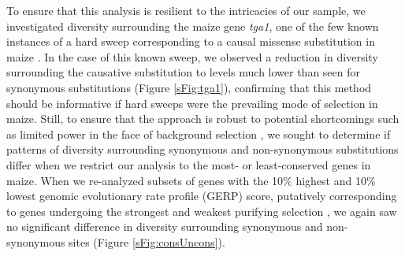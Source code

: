 \documentclass{pnastwo}
\begin{document}
\begin{article}
To ensure that this analysis is resilient to the intricacies of our sample, we investigated diversity surrounding the maize gene \emph{tga1}, one of the few known instances of a hard sweep corresponding to a causal missense substitution in maize \cite{wang2015}. In the case of this known sweep, we observed a reduction in diversity surrounding the causative substitution to levels much lower than seen for synonymous substitutions (Figure \ref{sFig:tga1}), confirming that this method should be informative if hard sweeps were the prevailing mode of selection in maize. Still, to ensure that the approach is robust to potential shortcomings such as limited power in the face of background selection \cite{enard2014}, we sought to determine if patterns of diversity surrounding synonymous and non-synonymous substitutions differ when we restrict our analysis to the most- or least-conserved genes in maize. When we re-analyzed subsets of genes with the 10\% highest and 10\% lowest genomic evolutionary rate profile (GERP) score, putatively corresponding to genes undergoing the strongest and weakest purifying selection \cite{davydov2010, cooper2005, rodgers2015}, we again saw no significant difference in diversity surrounding synonymous and non-synonymous sites (Figure \ref{sFig:consUncons}).


\end{article}
\end{document}
